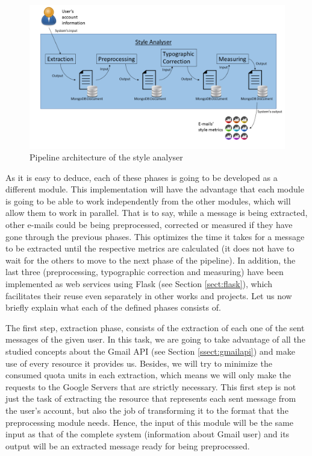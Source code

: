 \begin{figure}[h]
	\centering%
	\centerline{\includegraphics[width = 1.2\textwidth]{Imagenes/Bitmap/Analyser/architecture.png}}%
	\caption{Pipeline architecture of the style analyser}%
	\label{fig:arch}
\end{figure}

As it is easy to deduce, each of these phases is going to be developed as a different module. This implementation will have the advantage that each module is going to be able to work independently from the other modules, which will allow them to work in parallel. That is to say, while a message is being extracted, other e-mails could be being preprocessed, corrected or measured if they have gone through the previous phases. This optimizes the time it takes for a message to be extracted until the respective metrics are calculated (it does not have to wait for the others to move to the next phase of the pipeline). In addition, the last three (preprocessing, typographic correction and measuring) have been implemented as web services using Flask (see Section \ref{sect:flask}), which facilitates their reuse even separately in other works and projects. Let us now briefly explain what each of the defined phases consists of.

The first step, extraction phase, consists of the extraction of each one of the sent messages of the given user. In this task, we are going to take advantage of all the studied concepts about the Gmail API (see Section \ref{ssect:gmailapi}) and make use of every resource it provides us. Besides, we will try to minimize the consumed quota units in each extraction, which means we will only make the requests to the Google Servers that are strictly necessary. This first step is not just the task of extracting the resource that represents each sent message from the user's account, but also the job of transforming it to the format that the preprocessing module needs. Hence, the input of this module will be the same input as that of the complete system (information about Gmail user) and its output will be an extracted message ready for being preprocessed.

